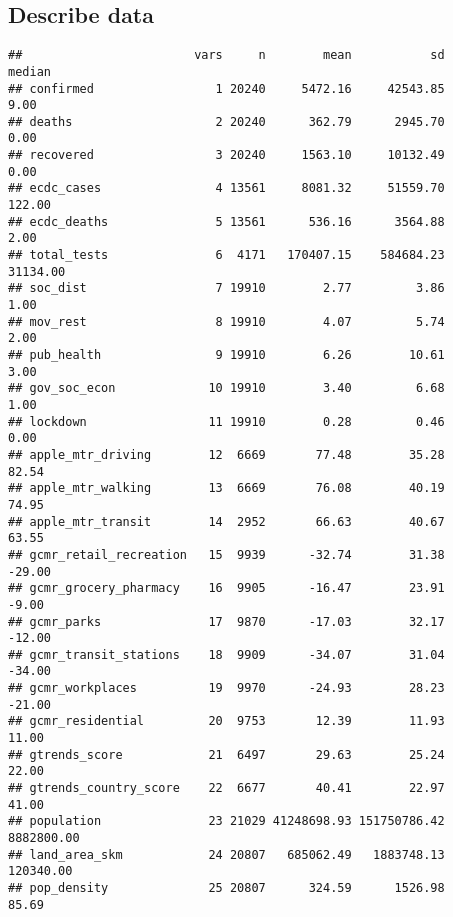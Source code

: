 \documentclass[]{article}
\newenvironment{Shaded}{\begin{snugshade}}{\end{snugshade}}
\newcommand{\KeywordTok}[1]{\textcolor[rgb]{0.13,0.29,0.53}{\textbf{#1}}}
\newcommand{\StringTok}[1]{\textcolor[rgb]{0.31,0.60,0.02}{#1}}
\newcommand{\OperatorTok}[1]{\textcolor[rgb]{0.81,0.36,0.00}{\textbf{#1}}}
\newcommand{\NormalTok}[1]{#1}
\begin{document}
\subsection{Describe data}\label{describe-data}

\begin{Shaded}
\end{Shaded}

\begin{verbatim}
##                        vars     n        mean           sd     median
## confirmed                 1 20240     5472.16     42543.85       9.00
## deaths                    2 20240      362.79      2945.70       0.00
## recovered                 3 20240     1563.10     10132.49       0.00
## ecdc_cases                4 13561     8081.32     51559.70     122.00
## ecdc_deaths               5 13561      536.16      3564.88       2.00
## total_tests               6  4171   170407.15    584684.23   31134.00
## soc_dist                  7 19910        2.77         3.86       1.00
## mov_rest                  8 19910        4.07         5.74       2.00
## pub_health                9 19910        6.26        10.61       3.00
## gov_soc_econ             10 19910        3.40         6.68       1.00
## lockdown                 11 19910        0.28         0.46       0.00
## apple_mtr_driving        12  6669       77.48        35.28      82.54
## apple_mtr_walking        13  6669       76.08        40.19      74.95
## apple_mtr_transit        14  2952       66.63        40.67      63.55
## gcmr_retail_recreation   15  9939      -32.74        31.38     -29.00
## gcmr_grocery_pharmacy    16  9905      -16.47        23.91      -9.00
## gcmr_parks               17  9870      -17.03        32.17     -12.00
## gcmr_transit_stations    18  9909      -34.07        31.04     -34.00
## gcmr_workplaces          19  9970      -24.93        28.23     -21.00
## gcmr_residential         20  9753       12.39        11.93      11.00
## gtrends_score            21  6497       29.63        25.24      22.00
## gtrends_country_score    22  6677       40.41        22.97      41.00
## population               23 21029 41248698.93 151750786.42 8882800.00
## land_area_skm            24 20807   685062.49   1883748.13  120340.00
## pop_density              25 20807      324.59      1526.98      85.69

\end{verbatim}
\end{document}
